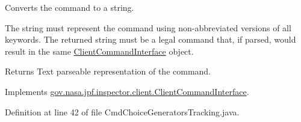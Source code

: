 Converts the command to a string. 

The string must represent the command using non-\/abbreviated versions of all keywords. The returned string must be a legal command that, if parsed, would result in the same \hyperlink{interfacegov_1_1nasa_1_1jpf_1_1inspector_1_1client_1_1_client_command_interface}{Client\+Command\+Interface} object.

\begin{DoxyReturn}{Returns}
Text parseable representation of the command. 
\end{DoxyReturn}


Implements \hyperlink{interfacegov_1_1nasa_1_1jpf_1_1inspector_1_1client_1_1_client_command_interface_a393044f5be05c3ab3451b72aeff7af62}{gov.\+nasa.\+jpf.\+inspector.\+client.\+Client\+Command\+Interface}.



Definition at line 42 of file Cmd\+Choice\+Generators\+Tracking.\+java.


